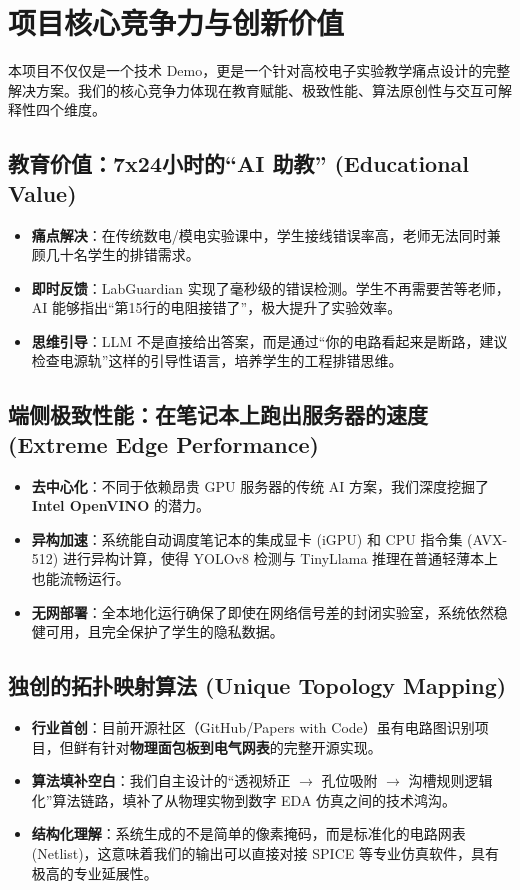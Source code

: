 \documentclass[a4paper,AutoFakeBold,oneside,12pt]{book}
\begin{document}
\chapter{项目核心竞争力与创新价值}

本项目不仅仅是一个技术 Demo，更是一个针对高校电子实验教学痛点设计的完整解决方案。我们的核心竞争力体现在教育赋能、极致性能、算法原创性与交互可解释性四个维度。

\section{教育价值：7x24小时的“AI 助教” (Educational Value)}
\begin{itemize}
    \item \textbf{痛点解决}：在传统数电/模电实验课中，学生接线错误率高，老师无法同时兼顾几十名学生的排错需求。
    \item \textbf{即时反馈}：LabGuardian 实现了毫秒级的错误检测。学生不再需要苦等老师，AI 能够指出“第15行的电阻接错了”，极大提升了实验效率。
    \item \textbf{思维引导}：LLM 不是直接给出答案，而是通过“你的电路看起来是断路，建议检查电源轨”这样的引导性语言，培养学生的工程排错思维。
\end{itemize}

\section{端侧极致性能：在笔记本上跑出服务器的速度 (Extreme Edge Performance)}
\begin{itemize}
    \item \textbf{去中心化}：不同于依赖昂贵 GPU 服务器的传统 AI 方案，我们深度挖掘了 \textbf{Intel OpenVINO} 的潜力。
    \item \textbf{异构加速}：系统能自动调度笔记本的集成显卡 (iGPU) 和 CPU 指令集 (AVX-512) 进行异构计算，使得 YOLOv8 检测与 TinyLlama 推理在普通轻薄本上也能流畅运行。
    \item \textbf{无网部署}：全本地化运行确保了即使在网络信号差的封闭实验室，系统依然稳健可用，且完全保护了学生的隐私数据。
\end{itemize}

\section{独创的拓扑映射算法 (Unique Topology Mapping)}
\begin{itemize}
    \item \textbf{行业首创}：目前开源社区（GitHub/Papers with Code）虽有电路图识别项目，但鲜有针对\textbf{物理面包板到电气网表}的完整开源实现。
    \item \textbf{算法填补空白}：我们自主设计的“透视矫正 $\rightarrow$ 孔位吸附 $\rightarrow$ 沟槽规则逻辑化”算法链路，填补了从物理实物到数字 EDA 仿真之间的技术鸿沟。
    \item \textbf{结构化理解}：系统生成的不是简单的像素掩码，而是标准化的电路网表 (Netlist)，这意味着我们的输出可以直接对接 SPICE 等专业仿真软件，具有极高的专业延展性。
\end{itemize}
\end{document}
